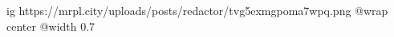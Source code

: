  
 
 
 
 

\ifcmt
  ig https://mrpl.city/uploads/posts/redactor/tvg5exmgpoma7wpq.png
  @wrap center
  @width 0.7
\fi
